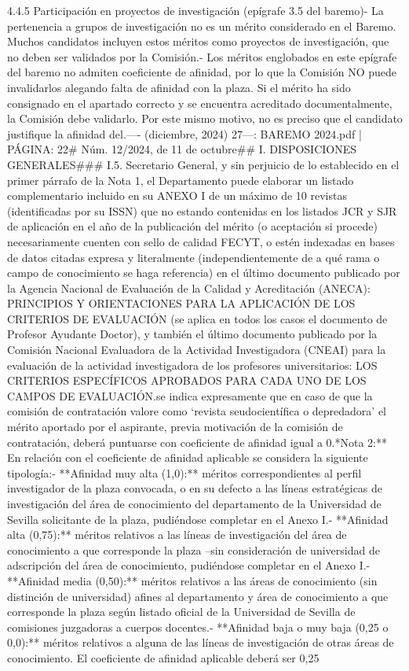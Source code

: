 \documentclass{article}
\begin{document}
\begin{itemize}
{4.4.5 Participación en proyectos de investigación (epígrafe 3.5 del baremo)\n\n- La pertenencia a grupos de investigación no es un mérito considerado en el Baremo. Muchos candidatos incluyen estos méritos como proyectos de investigación, que no deben ser validados por la Comisión.\n- Los méritos englobados en este epígrafe del baremo no admiten coeficiente de afinidad, por lo que la Comisión NO puede invalidarlos alegando falta de afinidad con la plaza. Si el mérito ha sido consignado en el apartado correcto y se encuentra acreditado documentalmente, la Comisión debe validarlo. Por este mismo motivo, no es preciso que el candidato justifique la afinidad del.\n\n----\n{} (diciembre, 2024) 27\n\n---\n\nFUENTE: BAREMO 2024.pdf | PÁGINA: 22\n# Núm. 12/2024, de 11 de octubre\n\n## I. DISPOSICIONES GENERALES\n\n### I.5. Secretario General\n\nAsimismo, y sin perjuicio de lo establecido en el primer párrafo de la Nota 1, el Departamento puede elaborar un listado complementario incluido en su ANEXO I de un máximo de 10 revistas (identificadas por su ISSN) que no estando contenidas en los listados JCR y SJR de aplicación en el año de la publicación del mérito (o aceptación si procede) necesariamente cuenten con sello de calidad FECYT, o estén indexadas en bases de datos citadas expresa y literalmente (independientemente de a qué rama o campo de conocimiento se haga referencia) en el último documento publicado por la Agencia Nacional de Evaluación de la Calidad y Acreditación (ANECA): PRINCIPIOS Y ORIENTACIONES PARA LA APLICACIÓN DE LOS CRITERIOS DE EVALUACIÓN (se aplica en todos los casos el documento de Profesor Ayudante Doctor), y también el último documento publicado por la Comisión Nacional Evaluadora de la Actividad Investigadora (CNEAI) para la evaluación de la actividad investigadora de los profesores universitarios: LOS CRITERIOS ESPECÍFICOS APROBADOS PARA CADA UNO DE LOS CAMPOS DE EVALUACIÓN.\n\nFinalmente se indica expresamente que en caso de que la comisión de contratación valore como ‘revista seudocientífica o depredadora’ el mérito aportado por el aspirante, previa motivación de la comisión de contratación, deberá puntuarse con coeficiente de afinidad igual a 0.\n\n**Nota 2:** En relación con el coeficiente de afinidad aplicable se considera la siguiente tipología:\n- **Afinidad muy alta (1,0):** méritos correspondientes al perfil investigador de la plaza convocada, o en su defecto a las líneas estratégicas de investigación del área de conocimiento del departamento de la Universidad de Sevilla solicitante de la plaza, pudiéndose completar en el Anexo I.\n- **Afinidad alta (0,75):** méritos relativos a las líneas de investigación del área de conocimiento a que corresponde la plaza –sin consideración de universidad de adscripción del área de conocimiento, pudiéndose completar en el Anexo I.\n- **Afinidad media (0,50):** méritos relativos a las áreas de conocimiento (sin distinción de universidad) afines al departamento y área de conocimiento a que corresponde la plaza según listado oficial de la Universidad de Sevilla de comisiones juzgadoras a cuerpos docentes.\n- **Afinidad baja o muy baja (0,25 o 0,0):** méritos relativos a alguna de las líneas de investigación de otras áreas de conocimiento. El coeficiente de afinidad aplicable deberá ser 0,25 }
\end{itemize}
\end{document}
